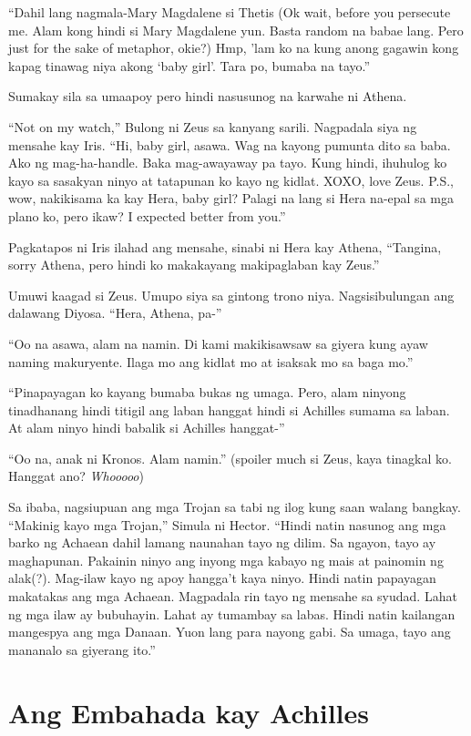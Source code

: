 \documentclass[12pt,letterpaper]{report}
\begin{document}
``Dahil lang nagmala-Mary Magdalene si Thetis (Ok wait, before you persecute me. Alam kong hindi si Mary Magdalene yun. Basta random na babae lang. Pero just for the sake of metaphor, okie?) Hmp, 'lam ko na kung anong gagawin kong kapag tinawag niya akong `baby girl'. Tara po, bumaba na tayo.''

Sumakay sila sa umaapoy pero hindi nasusunog na karwahe ni Athena.

``Not on my watch,'' Bulong ni Zeus sa kanyang sarili. Nagpadala siya ng mensahe kay Iris. ``Hi, baby girl, asawa. Wag na kayong pumunta dito sa baba. Ako ng mag-ha-handle. Baka mag-awayaway pa tayo. Kung hindi, ihuhulog ko kayo sa sasakyan ninyo at tatapunan ko kayo ng kidlat. XOXO, love Zeus. P.S., wow, nakikisama ka kay Hera, baby girl? Palagi na lang si Hera na-epal sa mga plano ko, pero ikaw? I expected better from you.''

Pagkatapos ni Iris ilahad ang mensahe, sinabi ni Hera kay Athena, ``Tangina, sorry Athena, pero hindi ko makakayang makipaglaban kay Zeus.''

Umuwi kaagad si Zeus. Umupo siya sa gintong trono niya. Nagsisibulungan ang dalawang Diyosa. ``Hera, Athena, pa-''

``Oo na asawa, alam na namin. Di kami makikisawsaw sa giyera kung ayaw naming makuryente. Ilaga mo ang kidlat mo at isaksak mo sa baga mo.''

``Pinapayagan ko kayang bumaba bukas ng umaga. Pero, alam ninyong tinadhanang hindi titigil ang laban hanggat hindi si Achilles sumama sa laban. At alam ninyo hindi babalik si Achilles hanggat-''


``Oo na, anak ni Kronos. Alam namin.'' (spoiler much si Zeus, kaya tinagkal ko. Hanggat ano? \textit{Whooooo})
 
Sa ibaba, nagsiupuan ang mga Trojan sa tabi ng ilog kung saan walang bangkay. ``Makinig kayo mga Trojan,'' Simula ni Hector. ``Hindi natin nasunog ang mga barko ng Achaean dahil lamang naunahan tayo ng dilim. Sa ngayon, tayo ay maghapunan. Pakainin ninyo ang inyong mga kabayo ng mais at painomin ng alak(?). Mag-ilaw kayo ng apoy hangga't kaya ninyo. Hindi natin papayagan makatakas ang mga Achaean. Magpadala rin tayo ng mensahe sa syudad. Lahat ng mga ilaw ay bubuhayin. Lahat ay tumambay sa labas. Hindi natin kailangan mangespya ang mga Danaan. Yuon lang para nayong gabi. Sa umaga, tayo ang mananalo sa giyerang ito.''
\pagebreak
\chapter{Ang Embahada kay Achilles}
\pagebreak
\end{document}

